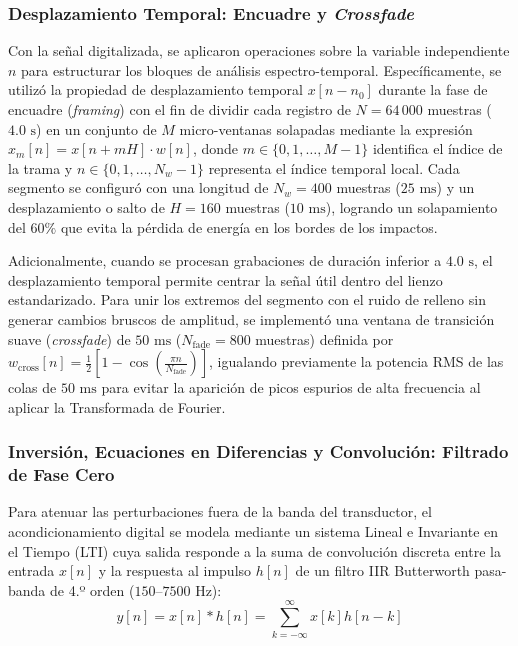 \documentclass[11pt, a4paper]{article}
\begin{document}
\subsubsection{Desplazamiento Temporal: Encuadre y \textit{Crossfade}}
Con la señal digitalizada, se aplicaron operaciones sobre la variable independiente $n$ para estructurar los bloques de análisis espectro-temporal. Específicamente, se utilizó la propiedad de desplazamiento temporal $x[n - n_0]$ durante la fase de encuadre (\textit{framing}) con el fin de dividir cada registro de $N = 64\,000$ muestras ($4.0\text{ s}$) en un conjunto de $M$ micro-ventanas solapadas mediante la expresión $x_m[n] = x[n + m H] \cdot w[n]$, donde $m \in \{0, 1, \dots, M-1\}$ identifica el índice de la trama y $n \in \{0, 1, \dots, N_w-1\}$ representa el índice temporal local. Cada segmento se configuró con una longitud de $N_w = 400$ muestras ($25\text{ ms}$) y un desplazamiento o salto de $H = 160$ muestras ($10\text{ ms}$), logrando un solapamiento del $60\%$ que evita la pérdida de energía en los bordes de los impactos.

Adicionalmente, cuando se procesan grabaciones de duración inferior a $4.0\text{ s}$, el desplazamiento temporal permite centrar la señal útil dentro del lienzo estandarizado. Para unir los extremos del segmento con el ruido de relleno sin generar cambios bruscos de amplitud, se implementó una ventana de transición suave (\textit{crossfade}) de $50\text{ ms}$ ($N_{\text{fade}} = 800$ muestras) definida por $w_{\text{cross}}[n] = \frac{1}{2} \left[ 1 - \cos\left(\frac{\pi n}{N_{\text{fade}}}\right) \right]$, igualando previamente la potencia RMS de las colas de $50\text{ ms}$ para evitar la aparición de picos espurios de alta frecuencia al aplicar la Transformada de Fourier.

\subsubsection{Inversión, Ecuaciones en Diferencias y Convolución: Filtrado de Fase Cero}
Para atenuar las perturbaciones fuera de la banda del transductor, el acondicionamiento digital se modela mediante un sistema Lineal e Invariante en el Tiempo (LTI) cuya salida responde a la suma de convolución discreta entre la entrada $x[n]$ y la respuesta al impulso $h[n]$ de un filtro IIR Butterworth pasa-banda de 4.º orden ($150\text{--}7500\text{ Hz}$):
\begin{equation}
    y[n] = x[n] * h[n] = \sum_{k=-\infty}^{\infty} x[k] h[n - k]
\end{equation}
\end{document}

